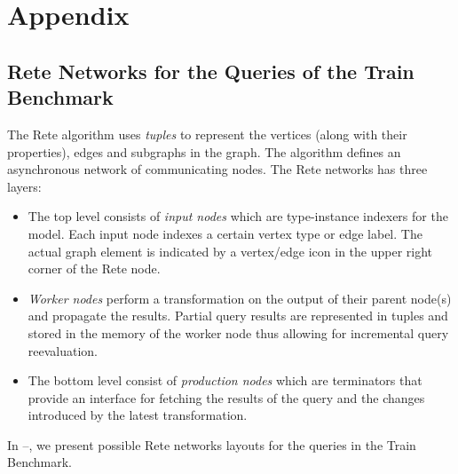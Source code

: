 \appendix
\chapter{Appendix}
\label{appendix}

\section{Rete Networks for the Queries of the Train Benchmark}

The Rete algorithm uses \emph{tuples} to represent the vertices (along with their properties), edges and subgraphs in the graph. The algorithm defines an asynchronous network of communicating nodes. The Rete networks has three layers:

\begin{itemize}
  \item The top level consists of \emph{input nodes} which are type-instance indexers for the model. Each input node indexes a certain vertex type or edge label. The actual graph element is indicated by a vertex/edge icon in the upper right corner of the Rete node.
  \item \emph{Worker nodes} perform a transformation on the output of their parent node(s) and propagate the results. Partial query results are represented in tuples and stored in the memory of the worker node thus allowing for incremental query reevaluation.
  \item The bottom level consist of \emph{production nodes} which are terminators that provide an interface for fetching the results of the query and the changes introduced by the latest transformation.
\end{itemize}

In --, we present possible Rete networks layouts for the queries in the Train Benchmark.

